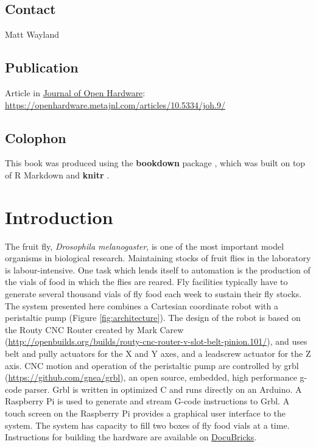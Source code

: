 \documentclass[]{book}
\theoremstyle{definition}
\theoremstyle{definition}
\theoremstyle{definition}
\theoremstyle{remark}
\begin{document}
\section*{Contact}\label{contact}

Matt Wayland

\section*{Publication}\label{publication}

Article in \href{https://openhardware.metajnl.com/}{Journal of Open
Hardware}:
\url{https://openhardware.metajnl.com/articles/10.5334/joh.9/}

\section*{Colophon}\label{colophon}

This book was produced using the \textbf{bookdown} package
\citep{R-bookdown}, which was built on top of R Markdown and
\textbf{knitr} \citep{xie2015}.

\chapter{Introduction}\label{intro}

The fruit fly, \emph{Drosophila melanogaster}, is one of the most
important model organisms in biological research. Maintaining stocks of
fruit flies in the laboratory is labour-intensive. One task which lends
itself to automation is the production of the vials of food in which the
flies are reared. Fly facilities typically have to generate several
thousand vials of fly food each week to sustain their fly stocks. The
system presented here combines a Cartesian coordinate robot with a
peristaltic pump (Figure \ref{fig:architecture}). The design of the
robot is based on the Routy CNC Router created by Mark Carew
(\url{http://openbuilds.org/builds/routy-cnc-router-v-slot-belt-pinion.101/}),
and uses belt and pully actuators for the X and Y axes, and a leadscrew
actuator for the Z axis. CNC motion and operation of the peristaltic
pump are controlled by grbl (\url{https://github.com/gnea/grbl}), an
open source, embedded, high performance g-code parser. Grbl is written
in optimized C and runs directly on an Arduino. A Raspberry Pi is used
to generate and stream G-code instructions to Grbl. A touch screen on
the Raspberry Pi provides a graphical user interface to the system. The
system has capacity to fill two boxes of fly food vials at a time.
Instructions for building the hardware are available on
\href{http://docubricks.com/viewer.jsp?id=8652757760093769728}{DocuBricks}.
\end{document}
